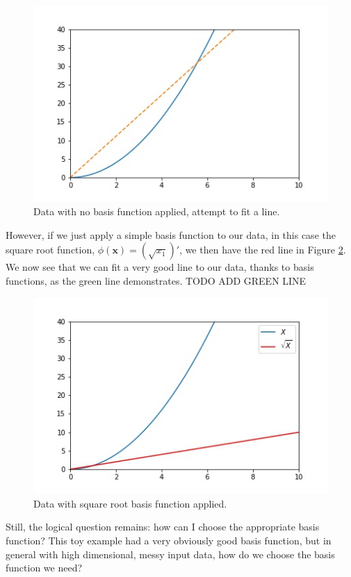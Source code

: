 \begin{figure}
    \centering
    \includegraphics[width=0.5\paperwidth]{../LinearRegression/fig/lin_reg_no_basis_fn_fitted_GEN.jpg}
    \caption{Data with no basis function applied, attempt to fit a line.}
    \label{fig:lin-reg-no-basis-fn-fitted}
\end{figure}

However, if we just apply a simple basis function to our data, in this case the square root function, $\phi(\textbf{x}) = (\sqrt{x_{1}})'$, we then have the red line in Figure \ref{fig:lin-reg-w-basis-fn-fitted}. We now see that we can fit a very good line to our data, thanks to basis functions, as the green line demonstrates. TODO ADD GREEN LINE

\begin{figure}
    \centering
    \includegraphics[width=0.5\paperwidth]{../LinearRegression/fig/lin_reg_w_basis_fn_GEN.jpg}
    \caption{Data with square root basis function applied.}
    \label{fig:lin-reg-w-basis-fn-fitted}
\end{figure}

Still, the logical question remains: how can I choose the appropriate basis function? This toy example had a very obviously good basis function, but in general with high dimensional, messy input data, how do we choose the basis function we need?

